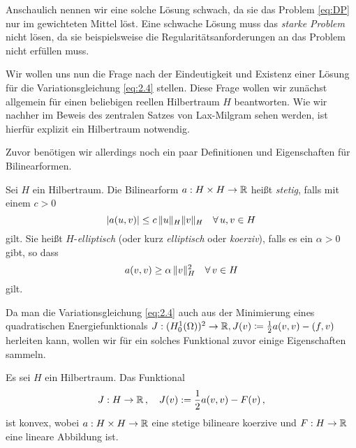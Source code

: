 Anschaulich nennen wir eine solche Lösung schwach, da sie das Problem \eqref{eq:DP} nur im gewichteten Mittel löst. Eine schwache Lösung muss das \textit{starke Problem} nicht lösen, da sie beispielsweise die Regularitätsanforderungen an das Problem nicht erfüllen muss.

Wir wollen uns nun die Frage nach der Eindeutigkeit und Existenz einer Lösung für die Variationsgleichung \eqref{eq:2.4} stellen. Diese Frage wollen wir zunächst allgemein für einen beliebigen reellen Hilbertraum $H$ beantworten. Wie wir nachher im Beweis des zentralen Satzes von Lax-Milgram sehen werden, ist hierfür explizit ein Hilbertraum notwendig.

Zuvor benötigen wir allerdings noch ein paar Definitionen und Eigenschaften für Bilinearformen.


\begin{defi}\label{def:2.9}
Sei $H$ ein Hilbertraum. Die Bilinearform  $a : H\times H \rightarrow \mathbb{R}$ heißt \textit{stetig}, falls mit einem $c>0$
\[
	\lvert a(u,v)\rvert \le c \, \lVert u\rVert_H   \lVert v\rVert_H \quad \forall \, u,v \in H
\]
gilt. Sie heißt $H$-\textit{elliptisch} (oder kurz \textit{elliptisch} oder \textit{koerziv}), falls es ein $\alpha > 0$ gibt, so dass
\[
	a(v,v) \ge \alpha \, \lVert v\rVert_H^2 \quad \forall \, v \in H 
\]
gilt.
\end{defi}


Da man die Variationsgleichung \eqref{eq:2.4} auch aus der Minimierung eines quadratischen Energiefunktionals $J: (H^1_0(\Omega))^2\rightarrow \mathbb{R}, J(v) \coloneqq \frac 12 a(v,v)-(f,v)$ herleiten kann, wollen wir für ein solches Funktional zuvor einige Eigenschaften sammeln.


\begin{lemma}\label{lem:2.10}
Es sei $H$ ein Hilbertraum. Das Funktional
\[
	J: H \rightarrow \mathbb{R} \, , \quad J(v) := \frac 1 2 a(v,v) - F(v) \, ,
\]
ist konvex, wobei $a: H\times H \rightarrow \mathbb{R}$ eine stetige bilineare koerzive und $F: H\rightarrow \mathbb{R}$ eine lineare Abbildung ist.
\end{lemma}


